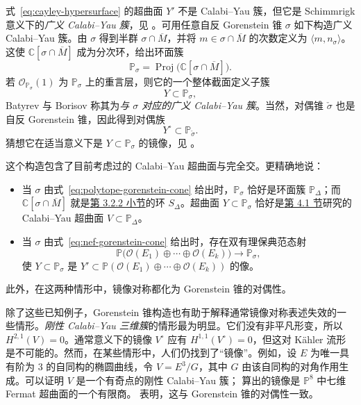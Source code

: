 式~\eqref{eq:cayley-hypersurface} 的超曲面 $Y'$ 不是 Calabi--Yau 簇，但它是 Schimmrigk 意义下的\emph{广义 Calabi--Yau 簇}，见 。可用任意自反 Gorenstein 锥 $\sigma$ 如下构造广义 Calabi--Yau 簇。由 $\sigma$ 得到半群 $\sigma\cap\overline M$，并将 $m\in\sigma\cap\overline M$ 的次数定义为 $\langle m,n_\sigma\rangle$。这使 $\mathbb C[\sigma\cap\overline M]$ 成为分次环，给出环面簇
\[
\mathbb P_\sigma=\operatorname{Proj}\bigl(\mathbb C[\sigma\cap\overline M]\bigr).
\]
若 $\mathcal O_{\mathbb P_\sigma}(1)$ 为 $\mathbb P_\sigma$ 上的重言层，则它的一个整体截面定义子簇
\[
Y\subset\mathbb P_\sigma,
\]
Batyrev 与 Borisov 称其为\emph{与 $\sigma$ 对应的广义 Calabi--Yau 簇}。当然，对偶锥 $\check\sigma$ 也是自反 Gorenstein 锥，因此得到对偶族
\[
Y^\circ\subset\mathbb P_{\check\sigma}.
\]
猜想它在适当意义下是 $Y\subset\mathbb P_\sigma$ 的镜像，见 。

这个构造包含了目前考虑过的 Calabi--Yau 超曲面与完全交。更精确地说：
\begin{itemize}
\item 当 $\sigma$ 由式~\eqref{eq:polytope-gorenstein-cone} 给出时，$\mathbb P_\sigma$ 恰好是环面簇 $\mathbb P_\Delta$；而 $\mathbb C[\sigma\cap\overline M]$ 就是\hyperref[subsec:toric-from-polytopes]{第 3.2.2 小节}的环 $S_\Delta$。超曲面 $Y\subset\mathbb P_\sigma$ 恰好是\hyperref[sec:batyrev-mirror]{第 4.1 节}研究的 Calabi--Yau 超曲面 $V\subset\mathbb P_\Delta$。
\item 当 $\sigma$ 由式~\eqref{eq:nef-gorenstein-cone} 给出时，存在双有理保典范态射
\[
\mathbb P\bigl(\mathcal O(E_1)\oplus\cdots\oplus\mathcal O(E_k)\bigr)
\longrightarrow\mathbb P_\sigma,
\]
使 $Y\subset\mathbb P_\sigma$ 是 $Y'\subset\mathbb P(\mathcal O(E_1)\oplus\cdots\oplus\mathcal O(E_k))$ 的像。
\end{itemize}
此外，在这两种情形中，镜像对称都化为 Gorenstein 锥的对偶性。

{\setlength{\emergencystretch}{1em}
除了这些已知例子，Gorenstein 锥构造也有助于解释通常镜像对称表述失效的一些情形。\emph{刚性 Calabi--Yau 三维簇}的情形最为明显。它们没有非平凡形变，所以 $H^{2,1}(V)=0$。通常意义下的镜像 $V^\circ$ 应有 $H^{1,1}(V^\circ)=0$，但这对 Kähler 流形是不可能的。然而，在某些情形中，人们仍找到了“镜像”。例如，设 $E$ 为唯一具有阶为 $3$ 的自同构的椭圆曲线，令 $V=E^3/G$，其中 $G$ 由该自同构的对角作用生成。可以证明 $V$ 是一个有奇点的刚性 Calabi--Yau 簇； 算出的镜像是 $\mathbb P^8$ 中七维 Fermat 超曲面的一个有限商。 表明，这与 Gorenstein 锥的对偶性一致。\par}

